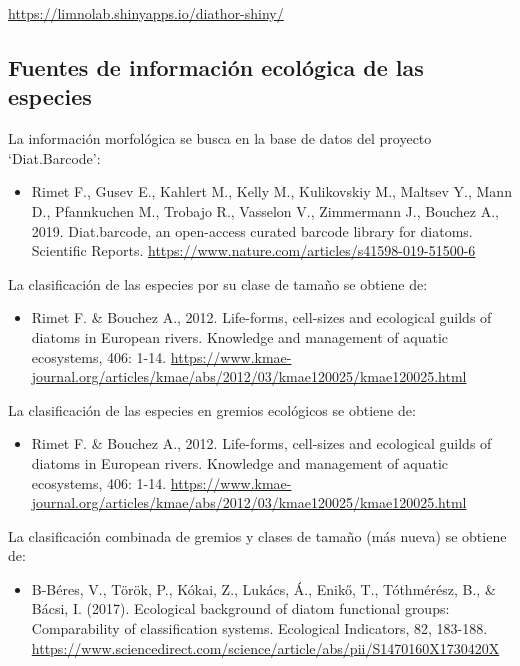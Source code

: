 \documentclass[
]{book}
\providecommand{\tightlist}{%
  \setlength{\itemsep}{0pt}\setlength{\parskip}{0pt}}
\begin{document}
\url{https://limnolab.shinyapps.io/diathor-shiny/}

\hypertarget{fuentes-de-informaciuxf3n-ecoluxf3gica-de-las-especies}{%
\subsection{Fuentes de información ecológica de las especies}\label{fuentes-de-informaciuxf3n-ecoluxf3gica-de-las-especies}}

La información morfológica se busca en la base de datos del proyecto `Diat.Barcode':

\begin{itemize}
\tightlist
\item
  Rimet F., Gusev E., Kahlert M., Kelly M., Kulikovskiy M., Maltsev Y., Mann D., Pfannkuchen M., Trobajo R., Vasselon V., Zimmermann J., Bouchez A., 2019. Diat.barcode, an open-access curated barcode library for diatoms. Scientific Reports. \url{https://www.nature.com/articles/s41598-019-51500-6}
\end{itemize}

La clasificación de las especies por su clase de tamaño se obtiene de:

\begin{itemize}
\tightlist
\item
  Rimet F. \& Bouchez A., 2012. Life-forms, cell-sizes and ecological guilds of diatoms in European rivers. Knowledge and management of aquatic ecosystems, 406: 1-14. \url{https://www.kmae-journal.org/articles/kmae/abs/2012/03/kmae120025/kmae120025.html}
\end{itemize}

La clasificación de las especies en gremios ecológicos se obtiene de:

\begin{itemize}
\tightlist
\item
  Rimet F. \& Bouchez A., 2012. Life-forms, cell-sizes and ecological guilds of diatoms in European rivers. Knowledge and management of aquatic ecosystems, 406: 1-14. \url{https://www.kmae-journal.org/articles/kmae/abs/2012/03/kmae120025/kmae120025.html}
\end{itemize}

La clasificación combinada de gremios y clases de tamaño (más nueva) se obtiene de:

\begin{itemize}
\tightlist
\item
  B-Béres, V., Török, P., Kókai, Z., Lukács, Á., Enikő, T., Tóthmérész, B., \& Bácsi, I. (2017). Ecological background of diatom functional groups: Comparability of classification systems. Ecological Indicators, 82, 183-188. \url{https://www.sciencedirect.com/science/article/abs/pii/S1470160X1730420X}
\end{itemize}
\end{document}
